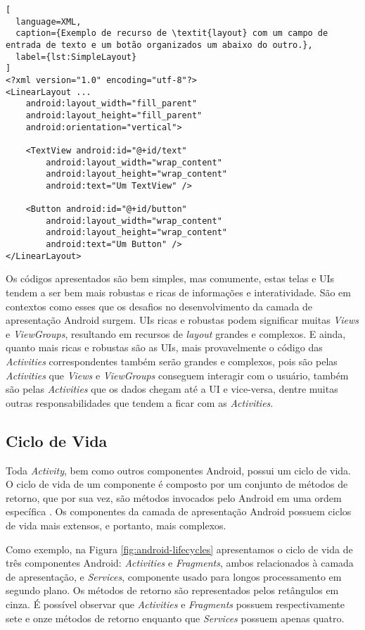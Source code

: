\begin{lstlisting}[
  language=XML, 
  caption={Exemplo de recurso de \textit{layout} com um campo de entrada de texto e um botão organizados um abaixo do outro.}, 
  label={lst:SimpleLayout}
]
<?xml version="1.0" encoding="utf-8"?>
<LinearLayout ...
    android:layout_width="fill_parent"
    android:layout_height="fill_parent"
    android:orientation="vertical">

    <TextView android:id="@+id/text"
        android:layout_width="wrap_content"
        android:layout_height="wrap_content"
        android:text="Um TextView" />

    <Button android:id="@+id/button"
        android:layout_width="wrap_content"
        android:layout_height="wrap_content"
        android:text="Um Button" />
</LinearLayout>
\end{lstlisting}

Os códigos apresentados são bem simples, mas comumente, estas telas e \acs{UI}s tendem a ser bem mais robustas e ricas de informações e interatividade. São em contextos como esses que os desafios no desenvolvimento da camada de apresentação Android surgem. \acs{UI}s ricas e robustas podem significar muitas \textit{Views} e \textit{ViewGroups}, resultando em recursos de \textit{layout} grandes e complexos. E ainda, quanto mais ricas e robustas são as \acs{UI}s, mais provavelmente o código das \textit{Activities} correspondentes também serão grandes e complexos, pois são pelas \textit{Activities} que \textit{Views} e \textit{ViewGroups} conseguem interagir com o usuário, também são pelas \textit{Activities} que os dados chegam até a \acs{UI} e vice-versa, dentre muitas outras responsabilidades que tendem a ficar com as \textit{Activities}.

\subsection{Ciclo de Vida}

Toda \textit{Activity}, bem como outros componentes Android, possui um ciclo de vida. O ciclo de vida de um componente é composto por um conjunto de métodos de retorno, que por sua vez, são métodos invocados pelo Android em uma ordem específica \cite{AndroidActivities2016}. Os componentes da camada de apresentação Android possuem ciclos de vida mais extensos, e portanto, mais complexos. 

Como exemplo, na Figura \ref{fig:android-lifecycles} apresentamos o ciclo de vida de três componentes Android: \textit{Activities} e \textit{Fragments}, ambos relacionados à camada de apresentação, e \textit{Services}, componente usado para longos processamento em segundo plano. Os métodos de retorno são representados pelos retângulos em cinza. É possível observar que \textit{Activities} e \textit{Fragments} possuem respectivamente sete e onze métodos de retorno enquanto que \textit{Services} possuem apenas quatro.

